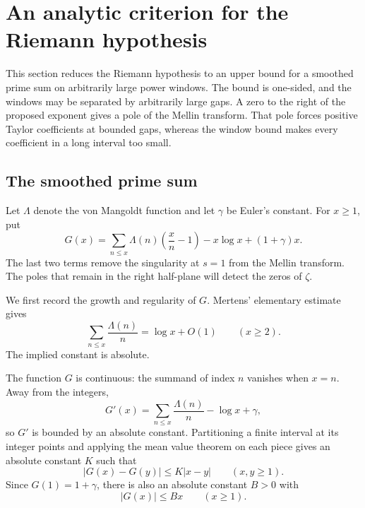 \section{An analytic criterion for the Riemann hypothesis}\label{sec:criterion}

This section reduces the Riemann hypothesis to an upper bound for a smoothed prime sum on arbitrarily large power windows. The bound is one-sided, and the windows may be separated by arbitrarily large gaps. A zero to the right of the proposed exponent gives a pole of the Mellin transform. That pole forces positive Taylor coefficients at bounded gaps, whereas the window bound makes every coefficient in a long interval too small.

\subsection{The smoothed prime sum}\label{subsec:smoothed-prime-sum}

Let $\Lambda$ denote the von Mangoldt function and let $\gamma$ be Euler's constant. For $x\geq 1$, put
\begin{equation}\label{eq:prime-sum}
G(x)
=
\sum_{n\leq x}\Lambda(n)\left(\frac{x}{n}-1\right)
-x\log x+(1+\gamma)x.
\end{equation}
The last two terms remove the singularity at $s=1$ from the Mellin transform. The poles that remain in the right half-plane will detect the zeros of $\zeta$.

We first record the growth and regularity of $G$. Mertens' elementary estimate~\cite[Theorem~0.20]{vaughan-mertens} gives
\[
\sum_{n\leq x}\frac{\Lambda(n)}{n}
=
\log x+O(1)
\qquad(x\geq 2).
\]
The implied constant is absolute.

The function $G$ is continuous: the summand of index $n$ vanishes when $x=n$. Away from the integers,
\[
G'(x)
=
\sum_{n\leq x}\frac{\Lambda(n)}{n}-\log x+\gamma,
\]
so $G'$ is bounded by an absolute constant. Partitioning a finite interval at its integer points and applying the mean value theorem on each piece gives an absolute constant $K$ such that
\[
|G(x)-G(y)|\leq K|x-y|
\qquad(x,y\geq 1).
\]
Since $G(1)=1+\gamma$, there is also an absolute constant $B>0$ with
\begin{equation}\label{eq:linear-growth}
|G(x)|\leq Bx
\qquad(x\geq 1).
\end{equation}

